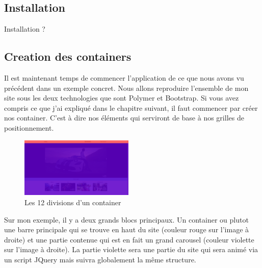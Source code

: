 \documentclass{article}
\begin{document}
\subsection{Installation}
Installation ?
\subsection{Creation des containers}

Il est maintenant temps de commencer l'application de ce que nous avons vu pr\'ec\'edent dans un exemple concret. Nous allons reproduire l'ensemble de mon site sous les deux technologies que sont Polymer et Bootstrap. Si vous avez compris ce que j'ai expliqu\'e dans le chapitre suivant, il faut commencer par cr\'eer nos container. C'est \`a dire nos \'el\'ements qui serviront de base \`a nos grilles de positionnement.\\

\begin{figure}
  \vspace{-25pt}
  \begin{center}
    \includegraphics[width=0.48\textwidth]{p18}
  \end{center}
  \vspace{-20pt}
  \caption{Les 12 divisions d'un container}
  \vspace{-10pt}
\end{figure} 

Sur mon exemple, il y a deux grands blocs principaux. Un container ou plutot une barre principale qui se trouve en haut du site (couleur rouge sur l'image \`a droite) et une partie contenue qui est en fait un grand carousel (couleur violette sur l'image \`a droite). La partie violette sera une partie du site qui sera anim\'e via un script JQuery mais suivra globalement la m\^eme structure.\\
\end{document}
